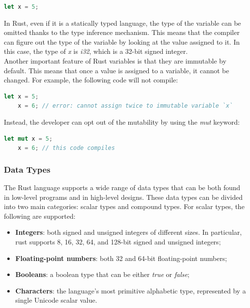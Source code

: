 \begin{lstlisting}[language=Rust]
    let x = 5;
\end{lstlisting}

In Rust, even if it is a statically typed language, the type of the variable can be omitted thanks to the type inference mechanism. This means that the compiler can figure out the type of the variable by looking at the value assigned to it. In this case, the type of \textit{x} is \textit{i32}, which is a 32-bit signed integer. \\

Another important feature of Rust variables is that they are immutable by default. This means that once a value is assigned to a variable, it cannot be changed.
For example, the following code will not compile:

\begin{lstlisting}[language=Rust]
    let x = 5;
    x = 6; // error: cannot assign twice to immutable variable `x`
\end{lstlisting}

Instead, the developer can opt out of the mutability by using the \textit{mut} keyword:

\begin{lstlisting}[language=Rust]
    let mut x = 5;
    x = 6; // this code compiles
\end{lstlisting}

\subsubsection{Data Types}
The Rust language supports a wide range of data types that can be both found in low-level programs and in high-level designs. These data types can be divided into two main categories: scalar types and compound types.
For scalar types, the following are supported:
\begin{itemize}
    \item \textbf{Integers}: both signed and unsigned integers of different sizes. In particular, rust supports 8, 16, 32, 64, and 128-bit signed and unsigned integers;
    \item \textbf{Floating-point numbers}: both 32 and 64-bit floating-point numbers;
    \item \textbf{Booleans}: a boolean type that can be either \textit{true} or \textit{false};
    \item \textbf{Characters}: the language's most primitive alphabetic type, represented by a single Unicode scalar value.
\end{itemize}

